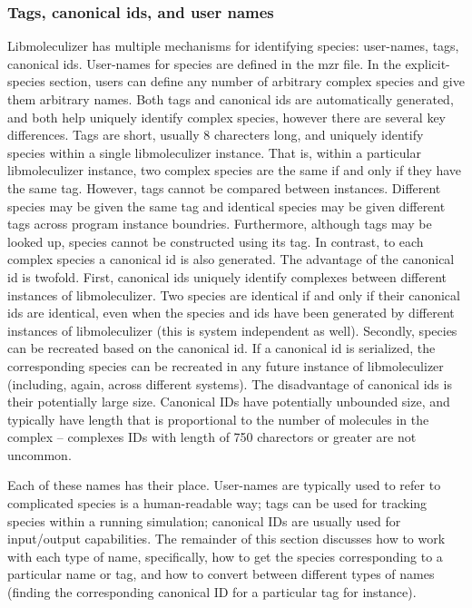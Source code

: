\subsubsection{Tags, canonical ids, and user names}

Libmoleculizer has multiple mechanisms for identifying species:
user-names, tags, canonical ids.  User-names for species are defined
in the mzr file.  In the explicit-species section, users can define
any number of arbitrary complex species and give them arbitrary
names.  Both tags and canonical ids are automatically generated, and
both help uniquely identify complex species, however there are several
key differences.  Tags are short, usually 8 charecters long, and
uniquely identify species within a single libmoleculizer instance.
That is, within a particular libmoleculizer instance, two complex
species are the same if and only if they have the same tag.  However,
tags cannot be compared between instances.  Different species may be
given the same tag and identical species may be given different tags
across program instance boundries.  Furthermore, although tags may be
looked up, species cannot be constructed using its tag.  In contrast,
to each complex species a canonical id is also generated.  The
advantage of the canonical id is twofold.  First, canonical ids
uniquely identify complexes between different instances of
libmoleculizer.  Two species are identical if and only if their
canonical ids are identical, even when the species and ids have been
generated by different instances of libmoleculizer (this is system
independent as well).  Secondly, species can be recreated based on the
canonical id.  If a canonical id is serialized, the corresponding
species can be recreated in any future instance of libmoleculizer
(including, again, across different systems).  The disadvantage of
canonical ids is their potentially large size.  Canonical IDs have
potentially unbounded size, and typically have length that is
proportional to the number of molecules in the complex -- complexes
IDs with length of 750 charectors or greater are not uncommon.

Each of these names has their place.  User-names are typically used to
refer to complicated species is a human-readable way; tags can be used
for tracking species within a running simulation; canonical IDs are
usually used for input/output capabilities.  The remainder of this
section discusses how to work with each type of name, specifically,
how to get the species corresponding to a particular name or tag, and
how to convert between different types of names (finding the
corresponding canonical ID for a particular tag for instance).

